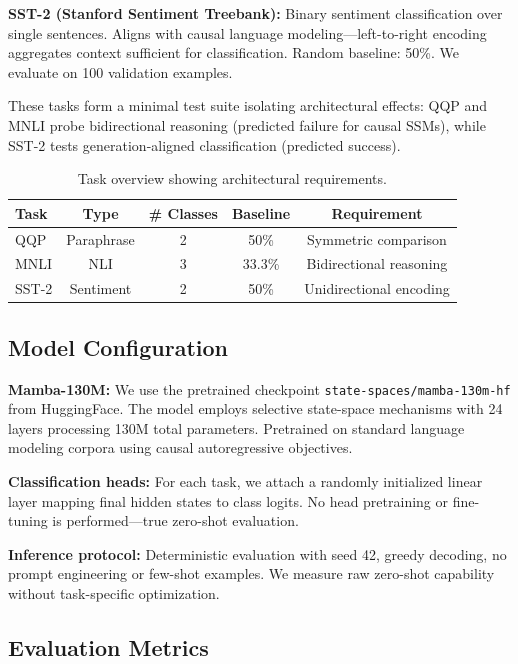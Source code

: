\textbf{SST-2 (Stanford Sentiment Treebank):} Binary sentiment classification over single sentences. Aligns with causal language modeling---left-to-right encoding aggregates context sufficient for classification. Random baseline: 50\%. We evaluate on 100 validation examples.

These tasks form a minimal test suite isolating architectural effects: QQP and MNLI probe bidirectional reasoning (predicted failure for causal SSMs), while SST-2 tests generation-aligned classification (predicted success).

\begin{table}[h]
\centering
\small
\begin{tabular}{lcccc}
\toprule
Task & Type & \# Classes & Baseline & Requirement \\
\midrule
QQP & Paraphrase & 2 & 50\% & Symmetric comparison \\
MNLI & NLI & 3 & 33.3\% & Bidirectional reasoning \\
SST-2 & Sentiment & 2 & 50\% & Unidirectional encoding \\
\bottomrule
\end{tabular}
\caption{Task overview showing architectural requirements.}
\label{tab:tasks}
\end{table}

\subsection{Model Configuration}

\textbf{Mamba-130M:} We use the pretrained checkpoint \texttt{state-spaces/mamba-130m-hf} from HuggingFace. The model employs selective state-space mechanisms with 24 layers processing 130M total parameters. Pretrained on standard language modeling corpora using causal autoregressive objectives.

\textbf{Classification heads:} For each task, we attach a randomly initialized linear layer mapping final hidden states to class logits. No head pretraining or fine-tuning is performed---true zero-shot evaluation.

\textbf{Inference protocol:} Deterministic evaluation with seed 42, greedy decoding, no prompt engineering or few-shot examples. We measure raw zero-shot capability without task-specific optimization.

\subsection{Evaluation Metrics}

